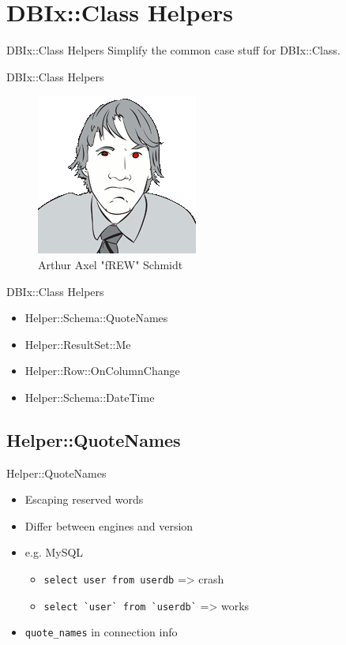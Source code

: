 \section{DBIx::Class Helpers}

\begin{frame}{DBIx::Class Helpers}
Simplify the common case stuff for DBIx::Class.
\end{frame}

\begin{frame}{DBIx::Class Helpers}
\begin{figure}[!ht]
\centering
\includegraphics[width=0.4\linewidth]{img/frew.png}
\caption{Arthur Axel "fREW" Schmidt}
\end{figure}
\end{frame}


\begin{frame}{DBIx::Class Helpers}
\begin{itemize}
\item Helper::Schema::QuoteNames
\item Helper::ResultSet::Me
\item Helper::Row::OnColumnChange
\item Helper::Schema::DateTime
\end{itemize}
\end{frame}

\subsection{Helper::QuoteNames}

\begin{frame}[fragile]{Helper::QuoteNames}
\begin{itemize}
\item Escaping reserved words
\item Differ between engines and version
\item e.g. MySQL
\begin{itemize}
\item \verb|select user from userdb| => crash
\item \verb|select `user` from `userdb`| => works
\end{itemize}
\item \verb|quote_names| in connection info
\end{itemize}
\end{frame}

